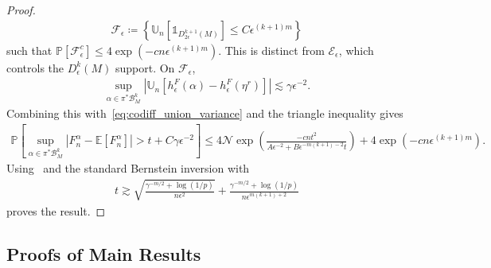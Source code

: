 \documentclass[11pt,reqno]{amsproc}
\numberwithin{equation}{section}
\newcommand{\E}{\mathbb{E}}
\newcommand{\U}{\mathbb{U}}
\newcommand{\PP}{\mathbb{P}}
\newcommand{\one}{\mathbb{1}}
\newcommand{\cF}{\mathcal{F}}
\newcommand{\cN}{\mathcal{N}}
\newcommand{\cE}{\mathcal{E}}
\newcommand{\cB}{\mathcal{B}}
\newcommand{\ls}{\lesssim}
\theoremstyle{definition}
\theoremstyle{plain}
\begin{document}
\begin{proof}
\begin{align}
        \cF_\epsilon \coloneqq \left\{\U_n[\one_{D^{k+1}_{2\epsilon}(M)}]\leq C\epsilon^{(k+1)m}\right\}
    \end{align}
    such that $\PP[\cF_\epsilon^c]\leq 4\exp(-cn\epsilon^{(k+1)m})$. This is distinct from $\cE_\epsilon$, which controls the $D^k_\epsilon(M)$ support. On $\cF_\epsilon$,
    \begin{align}
        \sup_{\alpha\in\pi^*\cB_M^k}|\U_n[h^F_\epsilon(\alpha)-h^F_\epsilon(\eta^r)]|\ls \gamma\epsilon^{-2}.
    \end{align}
    Combining this with~\eqref{eq:codiff_union_variance} and the triangle inequality gives
    \begin{align}
        \PP\left[\sup_{\alpha\in\pi^*\cB_M^k}|F_n^\alpha-\E[F_n^\alpha]|>t+C\gamma\epsilon^{-2}\right]
        \leq 4\cN\exp\left(\frac{-cnt^2}{A\epsilon^{-2}+B\epsilon^{-m(k+1)-2}t}\right)+4\exp(-cn\epsilon^{(k+1)m}).
    \end{align}
    Using~ and the standard Bernstein inversion with
    \begin{align}
        t\gtrsim \sqrt{\frac{\gamma^{-m/2}+\log(1/p)}{n\epsilon^2}}
        +\frac{\gamma^{-m/2}+\log(1/p)}{n\epsilon^{m(k+1)+2}}
    \end{align}
    proves the result.
\end{proof}


\subsection{Proofs of Main Results}
\end{document}
